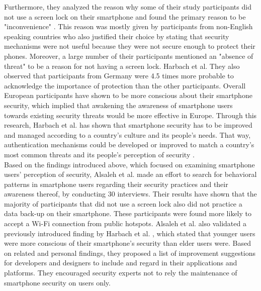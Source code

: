 Furthermore, they analyzed the reason why some of their study participants did not use a screen lock on their smartphone and found the primary reason to be "inconvenience" \cite{Harbach:2016}. This reason was mostly given by participants from non-English speaking countries who also justified their choice by stating that security mechanisms were not useful because they were not secure enough to protect their phones. Moreover, a large number of their participants mentioned an "absence of threat" \cite{Harbach:2016} to be a reason for not having a screen lock. Harbach et al. They also observed that participants from Germany were 4.5 times more probable to acknowledge the importance of protection than the other participants. Overall European participants have shown to be more conscious about their smartphone security, which implied that awakening the awareness of smartphone users towards existing security threats would be more effective in Europe. Through this research, Harbach et al. \cite{Harbach:2016} has shown that smartphone security has to be improved and managed according to a country's culture and its people's needs. That way, authentication mechanisms could be developed or improved to match a country's most common threats and its people's perception of security \cite{Harbach:2016}. \\ 

Based on the findings introduced above, which focused on examining smartphone users' perception of security, Alsaleh et al. \cite{Alsaleh} made an effort to search for behavioral patterns in smartphone users regarding their security practices and their awareness thereof, by conducting 30 interviews. Their results have shown that the majority of participants that did not use a screen lock also did not practice a data back-up on their smartphone. These participants were found more likely to accept a Wi-Fi connection from public hotspots. Alsaleh et al. \cite{Alsaleh} also validated a previously introduced finding by Harbach et al. \cite{Harbach:2016}, which stated that younger users were more conscious of  their smartphone's security than elder users were. Based on related and personal findings, they proposed a list of improvement suggestions for developers and designers to include and regard in their applications and platforms. They encouraged security experts not to rely the maintenance of smartphone security on users only.\\

